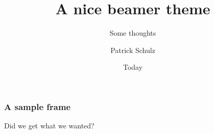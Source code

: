 \documentclass[x11names, svgnames]{beamer}
\title{A nice beamer theme}
\subtitle{Some thoughts}
\author{Patrick Schulz}
\date{Today}
\begin{document}
	\frame{\maketitle}
	\begin{frame}
		\frametitle{A sample frame}
		Did we get what we wanted?
	\end{frame}
\end{document}
